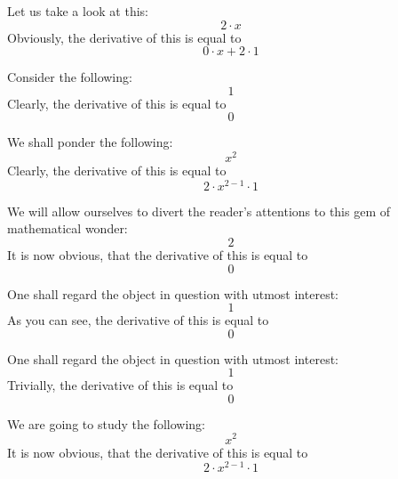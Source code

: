 \documentclass{article}
\begin{document}
Let us take a look at this:
\begin{equation}
2 \cdot x 
\end{equation}
Obviously, the derivative of this is equal to
\begin{equation}
0 \cdot x + 2 \cdot 1 
\end{equation}

Consider the following:
\begin{equation}
1 
\end{equation}
Clearly, the derivative of this is equal to
\begin{equation}
0 
\end{equation}

We shall ponder the following:
\begin{equation}
x ^{2 } 
\end{equation}
Clearly, the derivative of this is equal to
\begin{equation}
2 \cdot x ^{2 - 1 } \cdot 1 
\end{equation}

We will allow ourselves to divert the reader's attentions to this gem of mathematical wonder:
\begin{equation}
2 
\end{equation}
It is now obvious, that the derivative of this is equal to
\begin{equation}
0 
\end{equation}

One shall regard the object in question with utmost interest:
\begin{equation}
1 
\end{equation}
As you can see, the derivative of this is equal to
\begin{equation}
0 
\end{equation}

One shall regard the object in question with utmost interest:
\begin{equation}
1 
\end{equation}
Trivially, the derivative of this is equal to
\begin{equation}
0 
\end{equation}

We are going to study the following:
\begin{equation}
x ^{2 } 
\end{equation}
It is now obvious, that the derivative of this is equal to
\begin{equation}
2 \cdot x ^{2 - 1 } \cdot 1 
\end{equation}
\end{document}
